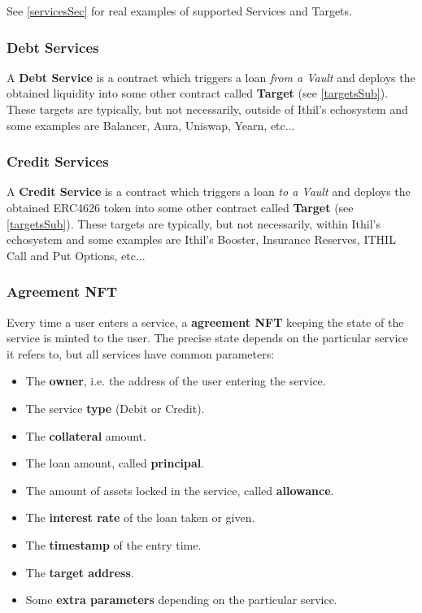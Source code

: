 \documentclass[a4paper,10 pt]{article}
\theoremstyle{definition}
\begin{document}
See \ref{servicesSec} for real examples of supported Services and Targets.
\subsubsection{Debt Services}\label{debtSubSub}
A {\bf Debt Service} is a contract which triggers a loan {\it from a Vault} and deploys the obtained liquidity into some other contract called {\bf Target} (see \ref{targetsSub}). These targets are typically, but not necessarily, outside of Ithil's echosystem and some examples are Balancer, Aura, Uniswap, Yearn, etc...

\subsubsection{Credit Services}\label{creditSubSub}
A {\bf Credit Service} is a contract which triggers a loan {\it to a Vault} and deploys the obtained ERC4626 token into some other contract called {\bf Target} (see \ref{targetsSub}). These targets are typically, but not necessarily, within Ithil's echosystem and some examples are Ithil's Booster, Insurance Reserves, ITHIL Call and Put Options, etc...

\subsubsection{Agreement NFT}\label{posNftSubSub}

Every time a user enters a service, a {\bf agreement NFT} keeping the state of the service is minted to the user. The precise state depends on the particular service it refers to, but all services have common parameters:
\begin{itemize}
\item The {\bf owner}, i.e. the address of the user entering the service.
\item The service {\bf type} (Debit or Credit).
\item The {\bf collateral} amount.
\item The loan amount, called {\bf principal}.
\item The amount of assets locked in the service, called {\bf allowance}.
\item The {\bf interest rate} of the loan taken or given.
\item The {\bf timestamp} of the entry time.
\item The {\bf target address}.
\item Some {\bf extra parameters} depending on the particular service.
\end{itemize}
\end{document}
